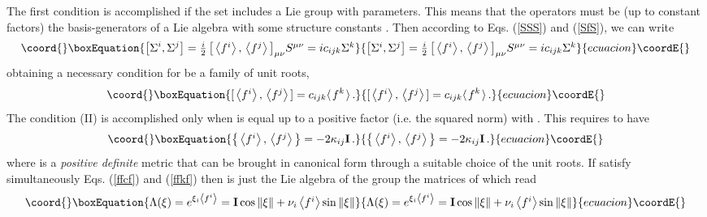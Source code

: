 \documentclass[a4paper,12pt]{article}
\begin{document}
The first condition is accomplished if the set \coordHE{} 
includes a Lie group with \coordHE{} parameters. This means that the  operators 
\coordHE{} must be (up to constant factors) the 
basis-generators of a Lie algebra with some structure constants \coordHE{}. 
Then according to Eqs. (\ref{SSS}) and (\ref{SfS}), we can write
\begin{equation}\coord{}\boxEquation{\label{SSffS}
\left[\Sigma^i, \Sigma^j\right]=
\textstyle{\frac{i}{2} \left[\,\left<f^i\right>,\,\left<f^j\right>\,
\right]_{\mu\nu}} S^{\mu\nu}= ic_{ijk}\Sigma^k 
}{\left[\Sigma^i, \Sigma^j\right]=
\textstyle{\frac{i}{2} \left[\,\left<f^i\right>,\,\left<f^j\right>\,
\right]_{\mu\nu}} S^{\mu\nu}= ic_{ijk}\Sigma^k 
}{ecuacion}\coordE{}\end{equation}
obtaining a necessary condition for \coordHE{} be a family of unit roots,
\begin{equation}\coord{}\boxEquation{\label{ffcf}
{\textstyle [\,\left<f^i\right>,\,\left<f^j\right>\, ]}=c_{ijk}
{\textstyle \left< \right.} f^k {\textstyle \left. \right>}\,.
}{{\textstyle [\,\left<f^i\right>,\,\left<f^j\right>\, ]}=c_{ijk}
{\textstyle \left< \right.} f^k {\textstyle \left. \right>}\,.
}{ecuacion}\coordE{}\end{equation} 
The condition (II) is accomplished only when \coordHE{} is equal up to a 
positive factor (i.e. the squared norm) with \coordHE{}. This requires to have
\begin{equation}\coord{}\boxEquation{\label{ffkf}
 \left\{\,\textstyle{\left<f^i\right>,\,\left<f^j\right>}\,\right\}
=-2\kappa_{ij} {\bf I}\,.
}{\left\{\,\textstyle{\left<f^i\right>,\,\left<f^j\right>}\,\right\}
=-2\kappa_{ij} {\bf I}\,.
}{ecuacion}\coordE{}\end{equation} 
where \myHighlight{$\kappa$}\coordHE{} is a {\em positive definite} metric that can be brought in 
canonical 
form \coordHE{} through a suitable choice of the 
unit roots.  
If \coordHE{} satisfy simultaneously Eqs. (\ref{ffcf}) and (\ref{ffkf}) then \coordHE{} is 
just the Lie algebra of the group \coordHE{} the 
matrices of which read
\begin{equation}\coord{}\boxEquation{\label{LX}  
\Lambda(\xi)=\textstyle{e^{\xi_i \left<f^i\right>}={\bf I}\cos\|\xi\|+
\nu_i \left<f^i\right>}\sin\|\xi\|
}{\Lambda(\xi)=\textstyle{e^{\xi_i \left<f^i\right>}={\bf I}\cos\|\xi\|+
\nu_i \left<f^i\right>}\sin\|\xi\|
}{ecuacion}\coordE{}\end{equation} 
\end{document}
